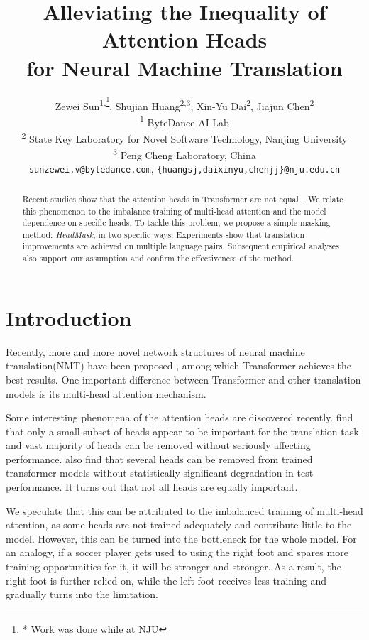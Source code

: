 \documentclass[11pt]{article}
\title{Alleviating the Inequality of Attention Heads \\ for Neural Machine Translation}
\author{
    Zewei Sun\textsuperscript{\rm 1,\thanks{* Work was done while at NJU}}, 
    Shujian Huang\textsuperscript{\rm 2,3},
    Xin-Yu Dai\textsuperscript{\rm 2}, 
    Jiajun Chen\textsuperscript{\rm 2} \\
    \textsuperscript{\rm 1} ByteDance AI Lab \\
    \textsuperscript{\rm 2} State Key Laboratory for Novel Software Technology, Nanjing University \\
    \textsuperscript{\rm 3} Peng Cheng Laboratory, China \\
    \texttt{sunzewei.v@bytedance.com}, 
    \texttt{\{huangsj,daixinyu,chenjj\}@nju.edu.cn}
}
\begin{document}
\maketitle
\begin{abstract}
Recent studies show that the attention heads in Transformer are not equal~\cite{Voita2019AnalyzingMS,Michel2019AreSH}.
We relate this phenomenon to the imbalance training of multi-head attention and the model dependence on specific heads. To tackle this problem, we propose a simple masking method: \textit{HeadMask}, in two specific ways. Experiments show that translation improvements are achieved on multiple language pairs. Subsequent empirical analyses also support our assumption and confirm the effectiveness of the method.
\end{abstract}

\section{Introduction}

Recently, more and more novel network structures of neural machine translation(NMT) have been proposed \cite{Bahdanau2015NeuralMT,Barone2017DeepAF,Gehring2017ConvolutionalST,Vaswani2017AttentionIA}, among which Transformer \cite{Vaswani2017AttentionIA} achieves the best results. One important difference between Transformer and other translation models is its multi-head attention mechanism. 

Some interesting phenomena of the attention heads are discovered recently.  find that only a small subset of heads appear to be important for the translation task and vast majority of heads can be removed without seriously affecting performance.  also find that several heads can be removed from trained transformer models without statistically significant degradation in
test performance. It turns out that not all heads are equally important.

We speculate that this can be attributed to the imbalanced training of multi-head attention, as some heads are not trained adequately and contribute little to the model. However, this can be turned into the bottleneck for the whole model. For an analogy, if a soccer player gets used to using the right foot and spares more training opportunities for it, it will be stronger and stronger. As a result, the right foot is further relied on, while the left foot receives less training and gradually turns into the limitation.
\end{document}
